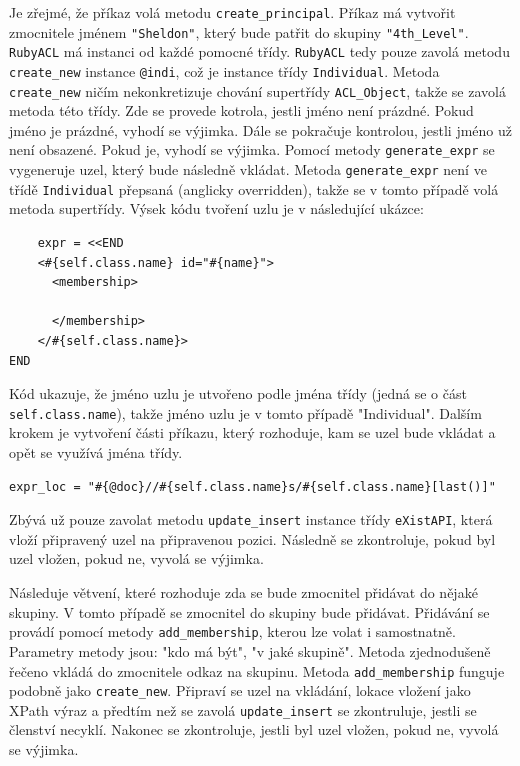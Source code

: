 Je zřejmé, že příkaz volá metodu \verb|create_principal|. Příkaz má vytvořit zmocnitele jménem \verb|"Sheldon"|, který bude patřit do skupiny \verb|"4th_Level"|. \verb|RubyACL| má instanci od každé pomocné třídy. \verb|RubyACL| tedy pouze zavolá metodu \verb|create_new| instance \verb|@indi|, což je instance třídy \verb|Individual|. Metoda \verb|create_new| ničím nekonkretizuje chování supertřídy \verb|ACL_Object|, takže se zavolá metoda této třídy. Zde se provede kotrola, jestli jméno není prázdné. Pokud jméno je prázdné, vyhodí se výjimka. Dále se pokračuje kontrolou, jestli jméno už není obsazené. Pokud je, vyhodí se výjimka. Pomocí metody \verb|generate_expr| se vygeneruje uzel, který bude následně vkládat. Metoda \verb|generate_expr| není ve třídě \verb|Individual| přepsaná (anglicky overridden), takže se v tomto případě volá metoda supertřídy. Výsek kódu tvoření uzlu je v následující ukázce:
\\
\begin{lstlisting}
    expr = <<END
    <#{self.class.name} id="#{name}">
      <membership>
        
      </membership>
    </#{self.class.name}>
END
\end{lstlisting}
Kód ukazuje, že jméno uzlu je utvořeno podle jména třídy (jedná se o část \verb|self.class.name|), takže jméno uzlu je v tomto případě "Individual". Dalším krokem je vytvoření části příkazu, který rozhoduje, kam se uzel bude vkládat a opět se využívá jména třídy.
\\
\begin{lstlisting}
expr_loc = "#{@doc}//#{self.class.name}s/#{self.class.name}[last()]"
\end{lstlisting}
Zbývá už pouze zavolat metodu \verb|update_insert| instance třídy \verb|eXistAPI|, která vloží připravený uzel na připravenou pozici. Následně se zkontroluje, pokud byl uzel vložen, pokud ne, vyvolá se výjimka.

Následuje větvení, které rozhoduje zda se bude zmocnitel přidávat do nějaké skupiny. V tomto případě se zmocnitel do skupiny bude přidávat. Přidávání se provádí pomocí metody \verb|add_membership|, kterou lze volat i samostnatně. Parametry metody jsou: "kdo má být", "v jaké skupině". Metoda zjednodušeně řečeno vkládá do zmocnitele odkaz na skupinu. Metoda \verb|add_membership| funguje podobně jako \verb|create_new|. Připraví se uzel na vkládání, lokace vložení jako XPath výraz a předtím než se zavolá \verb|update_insert| se zkontruluje, jestli se členství necyklí. Nakonec se zkontroluje, jestli byl uzel vložen, pokud ne, vyvolá se výjimka.



